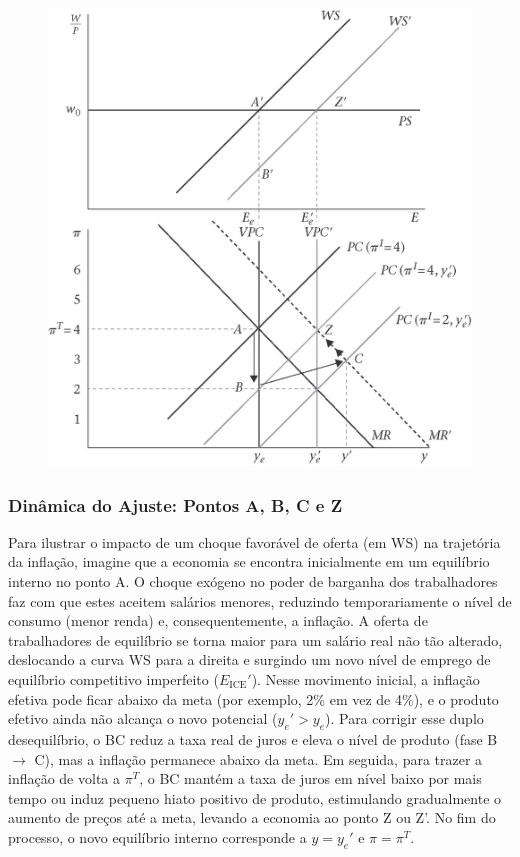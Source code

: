 \documentclass[a4paper,12pt]{article}[abntex2]
\begin{document}
\begin{figure}[H]
    \centering
    \includegraphics[width=0.7\linewidth]{Imagens/a14i1.png}
\end{figure}

\subsubsection{\textbf{Dinâmica do Ajuste: Pontos A, B, C e Z}}

Para ilustrar o impacto de um choque favorável de oferta (em WS) na trajetória da inflação, imagine que a economia se encontra inicialmente em um equilíbrio interno no ponto A. O choque exógeno no poder de barganha dos trabalhadores faz com que estes aceitem salários menores, reduzindo temporariamente o nível de consumo (menor renda) e, consequentemente, a inflação. A oferta de trabalhadores de equilíbrio se torna maior para um salário real não tão alterado, deslocando a curva WS para a direita e surgindo um novo nível de emprego de equilíbrio competitivo imperfeito ($E_{\text{ICE}}'$). Nesse movimento inicial, a inflação efetiva pode ficar abaixo da meta (por exemplo, 2\% em vez de 4\%), e o produto efetivo ainda não alcança o novo potencial ($y_e' > y_e$). Para corrigir esse duplo desequilíbrio, o BC reduz a taxa real de juros e eleva o nível de produto (fase B $\to$ C), mas a inflação permanece abaixo da meta. Em seguida, para trazer a inflação de volta a $\pi^T$, o BC mantém a taxa de juros em nível baixo por mais tempo ou induz pequeno hiato positivo de produto, estimulando gradualmente o aumento de preços até a meta, levando a economia ao ponto Z ou Z'. No fim do processo, o novo equilíbrio interno corresponde a $y = y_e'$ e $\pi = \pi^T$.
\end{document}
